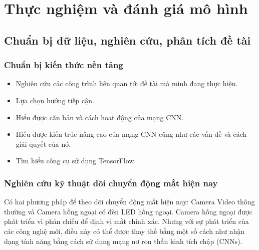 \chapter {Thực nghiệm và đánh giá mô hình}

\section{Chuẩn bị dữ liệu, nghiên cứu, phân tích đề tài }
\subsection{Chuẩn bị kiến thức nền tảng}
\begin{itemize}
\item Nghiên cứu các công trình liên quan tới đề tài mà mình đang thực hiện.
\item Lựa chọn hướng tiếp cận.
\item Hiểu được căn bản và cách hoạt động của mạng CNN.
\item Hiểu được kiến trúc nâng cao của mạng CNN cũng như các vấn đề và cách giải quyết của nó.
\item Tìm hiểu công cụ sử dụng TensorFlow
\end{itemize}

\subsection{Nghiên cứu kỹ thuật dõi chuyển động mắt hiện nay}
Có hai phương pháp để theo dõi chuyển động mắt hiện nay: Camera Video thông thường và Camera hồng ngoại có đèn LED hồng ngoại. 
Camera hồng ngoại được phát triển vì phản chiếu để định vị mắt  chính xác. Nhưng với sự phát triển của các công nghệ mới, điều này có thể được thay thế bằng một số cách như nhận dạng tính năng bằng cách sử dụng mạng nơ ron thần kinh tích chập (CNNs).

